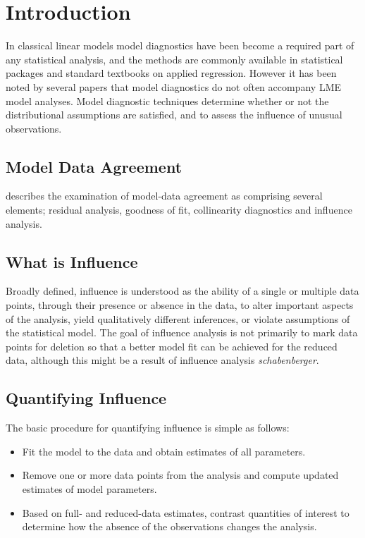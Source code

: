 \documentclass[Chap5amain.tex]{subfiles}
\begin{document}
\section{Introduction}%
In classical linear models model diagnostics have been become a required part of any statistical analysis, and the methods are commonly available in statistical packages and standard textbooks on applied regression. However it has been noted by several papers that model diagnostics do not often accompany LME model analyses.
Model diagnostic techniques determine whether or not the distributional assumptions are satisfied, and to assess the influence of unusual observations.

\subsection{Model Data Agreement} %
\citet{schabenberger} describes the examination of model-data agreement as comprising several elements; residual analysis, goodness of fit, collinearity diagnostics and influence analysis.



\subsection*{What is Influence} %

Broadly defined, influence is understood as the ability of a single or multiple data points, through their presence or absence in the data, to alter important aspects of the analysis, yield qualitatively different inferences, or violate assumptions of the statistical model. The goal of influence analysis is not primarily to mark data
points for deletion so that a better model fit can be achieved for the reduced data, although this might be a result of influence analysis \textit{schabenberger}.

\subsection*{Quantifying Influence}  %

The basic procedure for quantifying influence is simple as follows:

\begin{itemize}
\item Fit the model to the data and obtain estimates of all parameters.
\item Remove one or more data points from the analysis and compute updated estimates of model parameters.
\item Based on full- and reduced-data estimates, contrast quantities of interest to determine how the absence of the observations changes the analysis.
\end{itemize}
\end{document}
